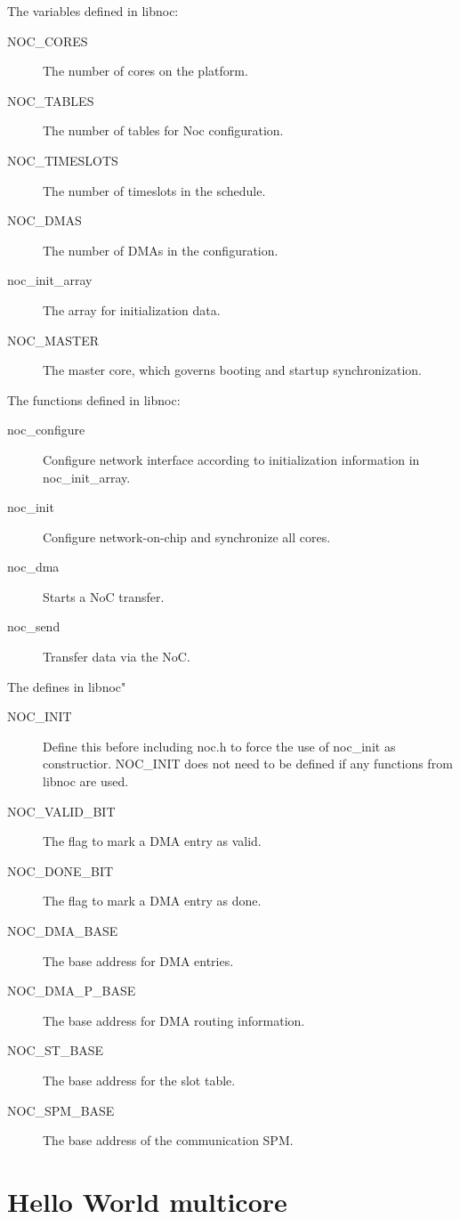\documentclass[a4paper,fontsize=10pt,twoside,DIV15,BCOR12mm,headinclude=true,footinclude=false,pagesize,bibtotoc]{scrbook}
\begin{document}
The variables defined in libnoc:
\begin{description}
\item[NOC\_CORES] The number of cores on the platform. 
\item[NOC\_TABLES] The number of tables for Noc configuration. 
\item[NOC\_TIMESLOTS] The number of timeslots in the schedule. 
\item[NOC\_DMAS]	The number of DMAs in the configuration. 
\item[noc\_init\_array] The array for initialization data. 
\item[NOC\_MASTER] The master core, which governs booting and startup synchronization. 
\end{description}


The functions defined in libnoc:
\begin{description}
\item [noc\_configure] Configure network interface according to initialization information in noc\_init\_array.
\item [noc\_init] Configure network-on-chip and synchronize all cores. 
\item [noc\_dma] Starts a NoC transfer. 
\item [noc\_send] Transfer data via the NoC. 
\end{description}

The defines in libnoc"
\begin{description}
\item [NOC\_INIT] Define this before including noc.h to force the use of noc\_init as constructior. NOC\_INIT does not need to be defined if any functions from libnoc are used.
\item [NOC\_VALID\_BIT] The flag to mark a DMA entry as valid.
\item [NOC\_DONE\_BIT] The flag to mark a DMA entry as done.
\item [NOC\_DMA\_BASE] The base address for DMA entries.
\item [NOC\_DMA\_P\_BASE] The base address for DMA routing information.
\item [NOC\_ST\_BASE] The base address for the slot table.
\item [NOC\_SPM\_BASE] The base address of the communication SPM.
\end{description}

\section{Hello World multicore}
\end{document}
